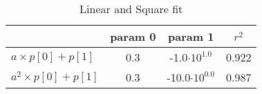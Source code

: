 \documentclass{article}
\begin{document}
\nonstopmode
\setcounter{table}{0}
\begin{table}
\centering
\caption{Linear and Square fit}
\begin{tabular}{|l|ccc|}
\toprule
{} & param 0 &                param 1 &  $r^2$ \\
\midrule
$a \times p[0] + p[1]$   &     0.3 &   -1.0$\cdot 10^{1.0}$ &  0.922 \\
$a^2 \times p[0] + p[1]$ &     0.3 &  -10.0$\cdot 10^{0.0}$ &  0.987 \\
\bottomrule
\end{tabular}
\end{table}
\end{document}
